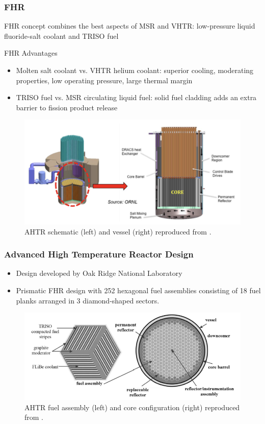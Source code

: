 \begin{frame}
  \frametitle{\acrlong{FHR}}
  FHR concept combines the best aspects of MSR and VHTR:
  low-pressure liquid fluoride-salt coolant and TRISO fuel 
  \begin{block}{\acrfull{FHR} Advantages}
    \begin{itemize}
      \item Molten salt coolant vs. VHTR helium coolant: superior cooling, 
      moderating properties, low operating pressure, large thermal margin
      \item TRISO fuel vs. MSR circulating liquid fuel: solid fuel cladding 
      adds an extra barrier to fission product release
    \end{itemize}
  \end{block}
  \begin{figure}[]
    \centering
    \includegraphics[width=0.5\linewidth]{../docs/figures/reactor-schematic.png} 
    \caption{\acrfull{AHTR} schematic (left) and vessel (right) reproduced from
    \cite{noauthor_fluoride_nodate}.}
\end{figure}
\end{frame}
\begin{frame}
  \frametitle{Advanced High Temperature Reactor Design}
    \begin{itemize}
      \item Design developed by Oak Ridge National Laboratory
      \item Prismatic FHR design with 252 hexagonal fuel assemblies consisting of 
      18 fuel planks arranged in 3 diamond-shaped sectors. 
    \end{itemize}
  \begin{figure}[]
    \centering
    \includegraphics[width=0.9\linewidth]{../docs/figures/ahtr.png} 
    \caption{\acrlong{AHTR} fuel assembly (left) and core configuration (right) 
    reproduced from \cite{ramey_monte_2018}.}
    \label{fig:ahtr}
\end{figure}
\end{frame}


